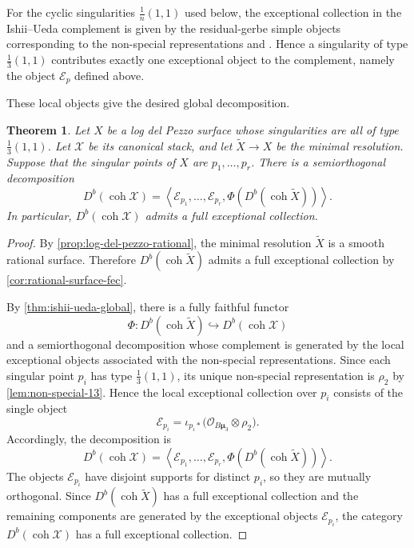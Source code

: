 \documentclass[11pt]{article}
\theoremstyle{plain}
\newtheorem{theorem}{Theorem}[section]
\theoremstyle{definition}
\theoremstyle{remark}
\newcommand{\Db}{D^b}
\newcommand{\coh}{\operatorname{coh}}
\newcommand{\XX}{\mathcal X}
\newcommand{\muthree}{\boldsymbol{\mu}_3}
\newcommand{\OO}{\mathcal O}
\begin{document}
For the cyclic singularities \(\frac1n(1,1)\) used below, the exceptional collection in the Ishii--Ueda complement is given by the residual-gerbe simple objects corresponding to the non-special representations \cite[Proposition~1.1 and Theorem~1.2]{Ishii2015} and \cite[Example~2.6]{GugiattiRota2023}. Hence a singularity of type \(\frac13(1,1)\) contributes exactly one exceptional object to the complement, namely the object \(\mathcal E_p\) defined above.

These local objects give the desired global decomposition.

\begin{theorem}\label{thm:general-fec}
Let \(X\) be a log del Pezzo surface whose singularities are all of type \(\frac13(1,1)\). Let \(\XX\) be its canonical stack, and let \(\widetilde X\to X\) be the minimal resolution. Suppose that the singular points of \(X\) are \(p_1,\dots,p_r\). There is a semiorthogonal decomposition
\[
\Db(\coh \XX)
=
\left\langle
\mathcal E_{p_1},\dots,\mathcal E_{p_r},
\Phi(\Db(\coh \widetilde X))
\right\rangle.
\]
In particular, \(\Db(\coh \XX)\) admits a full exceptional collection.
\end{theorem}

\begin{proof}
By \cref{prop:log-del-pezzo-rational}, the minimal resolution \(\widetilde X\) is a smooth rational surface. Therefore \(\Db(\coh \widetilde X)\) admits a full exceptional collection by \cref{cor:rational-surface-fec}.

By \cref{thm:ishii-ueda-global}, there is a fully faithful functor
\[
\Phi:\Db(\coh \widetilde X)\hookrightarrow \Db(\coh \XX)
\]
and a semiorthogonal decomposition whose complement is generated by the local exceptional objects associated with the non-special representations. Since each singular point \(p_i\) has type \(\frac13(1,1)\), its unique non-special representation is \(\rho_2\) by \cref{lem:non-special-13}. Hence the local exceptional collection over \(p_i\) consists of the single object
\[
\mathcal E_{p_i}
=
\iota_{p_i*}\bigl(\OO_{B\muthree}\otimes \rho_2\bigr).
\]
Accordingly, the decomposition is
\[
\Db(\coh \XX)
=
\left\langle
\mathcal E_{p_1},\dots,\mathcal E_{p_r},
\Phi(\Db(\coh \widetilde X))
\right\rangle.
\]
The objects \(\mathcal E_{p_i}\) have disjoint supports for distinct \(p_i\), so they are mutually orthogonal. Since \(\Db(\coh \widetilde X)\) has a full exceptional collection and the remaining components are generated by the exceptional objects \(\mathcal E_{p_i}\), the category \(\Db(\coh \XX)\) has a full exceptional collection.
\end{proof}
\end{document}
